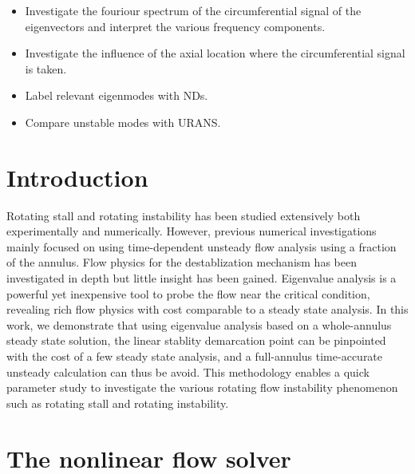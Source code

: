 \documentclass[journal,final]{new-aiaa}
\begin{document}
\begin{itemize}
	\item  {\color{red} Investigate the fouriour spectrum
		of the circumferential signal of the eigenvectors and
		interpret the various frequency components.}
	\item {\color{red} Investigate the influence of the axial
		location where the circumferential signal is taken.}
	\item {\color{red} Label relevant eigenmodes with NDs.}
	\item {\color{red} Compare unstable modes with URANS.}
\end{itemize}


\section{Introduction}
Rotating stall and rotating instability has been studied extensively
both experimentally and numerically. However, previous numerical
investigations mainly focused on using time-dependent unsteady
flow analysis using a fraction of the annulus. Flow physics for
the destablization mechanism has been investigated in depth
but little insight has been gained. Eigenvalue analysis is a powerful
yet inexpensive tool to probe the flow near the critical condition,
revealing rich flow physics with cost comparable to a steady state
analysis. In this work, we demonstrate that using eigenvalue analysis
based on a whole-annulus steady state solution, the linear stablity
demarcation point can be pinpointed with the cost of a few steady
state analysis, and a full-annulus time-accurate unsteady calculation
can thus be avoid. This methodology enables a quick parameter
study to investigate the various rotating flow instability phenomenon
such as rotating stall and rotating instability.

\section{The nonlinear flow solver}
\end{document}
